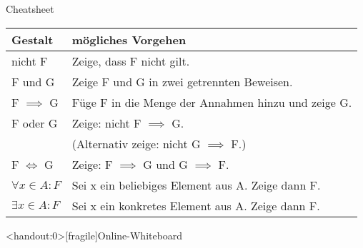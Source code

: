  \begin{frame}[fragile]{Cheatsheet}
     \small
     \begin{tabular}{p{} p{}}
     \toprule
     Gestalt&mögliches Vorgehen\\
     \midrule
         nicht F&Zeige, dass F nicht gilt.\\
         F und G&Zeige F und G in zwei getrennten Beweisen.\\
         F $\implies$ G&Füge F in die Menge der Annahmen hinzu und zeige G.\\
         F oder G&Zeige: nicht F $\implies$ G. \\&(Alternativ zeige: nicht G $\implies$ F.)\\
         F $\iff$ G&Zeige: F $\implies$ G und G $\implies$ F.\\
         $\forall x \in A : F$&Sei x ein beliebiges Element aus A. Zeige dann F.\\
         $\exists x \in A : F$&Sei x ein konkretes Element aus A. Zeige dann F.\\
     \bottomrule
     \end{tabular}
 \end{frame}

\appendix
\begin{frame}<handout:0>[fragile]{Online-Whiteboard}
	\phantom{text}
\end{frame}


